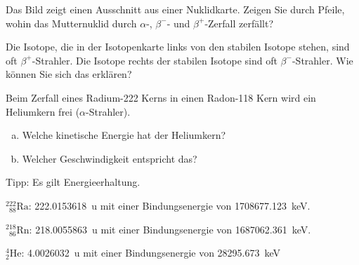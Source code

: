 \documentclass[12pt,a4paper,twoside]{article}
\newcommand{\Kern}[3]{$^{#1}_{\phantom{1}#2}\text{#3}$}
\begin{document}
\begin{aufgabe}
	Das Bild zeigt einen Ausschnitt aus einer Nuklidkarte. 
	Zeigen Sie durch Pfeile, wohin das Mutternuklid durch $\alpha$-, $\beta^{-}$- und $\beta^{+}$-Zerfall zerfällt?

	\begin{center}
		
	\end{center}

\end{aufgabe}

\begin{aufgabe}
	Die Isotope, die in der Isotopenkarte links von den stabilen Isotope stehen, sind oft $\beta^{+}$-Strahler.
	Die Isotope rechts der stabilen Isotope sind oft $\beta^{-}$-Strahler. Wie können Sie sich das erklären?
\end{aufgabe}

\begin{aufgabe}
	Beim Zerfall eines Radium-222 Kerns in einen Radon-118 Kern 
	wird ein Heliumkern frei ($\alpha$-Strahler).
	\begin{enumerate}[a)]
		\item Welche kinetische Energie hat der Heliumkern?
		\item Welcher Geschwindigkeit entspricht das?
	\end{enumerate}
	Tipp: Es gilt Energieerhaltung.

	\Kern{222}{88}{Ra}: \SI{222.0153618}{u} 
	mit einer Bindungsenergie von \SI{1708677.123}{keV}.

	\Kern{218}{86}{Rn}: \SI{218.0055863}{u}
	mit einer Bindungsenergie von \SI{1687062.361}{keV}.

	$^4_2\text{He}$: \SI{4.0026032}{u}
	mit einer Bindungsenergie von \SI{28295.673}{keV}


\end{aufgabe}
\end{document}
